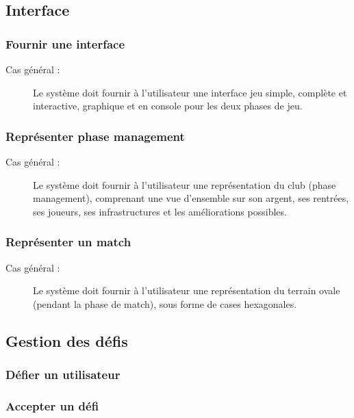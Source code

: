 \documentclass[a4paper]{report}
\begin{document}
\subsection{Interface}
\subsubsection{Fournir une interface}
\begin{description}
    \item[Cas général :] Le système doit fournir à l'\gls{utilisateur} une interface jeu simple, complète et interactive, graphique et en console pour les deux phases de jeu.
\end{description}

\subsubsection{Représenter phase management}
\begin{description}
    \item[Cas général :] Le système doit fournir à l'\gls{utilisateur} une représentation du \gls{club} (phase management), comprenant une vue d'ensemble sur son argent, ses rentrées, ses \glspl{joueur}, ses infrastructures et les améliorations possibles.
\end{description}

\subsubsection{Représenter un match}
\begin{description}
    \item[Cas général :] Le système doit fournir à l'\gls{utilisateur} une représentation du terrain ovale (pendant la phase de match), sous forme de cases hexagonales.
\end{description}

\subsection{Gestion des défis}
\subsubsection{Défier un utilisateur}

\subsubsection{Accepter un défi}
\end{document}
